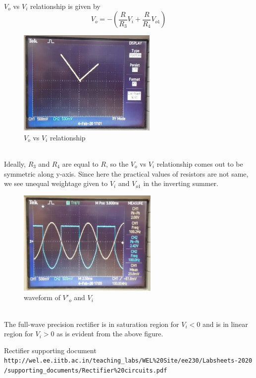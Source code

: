\documentclass[12pt]{article}
\begin{document}
        \\
        $V_o$ vs $V_i$ relationship is given by
        \begin{equation}
            V_o = -(\frac{R}{R_3}V_i + \frac{R}{R_4}V_{o1})
        \end{equation}
        \begin{figure}[H]
            \centering
            \includegraphics[width = 0.5\linewidth, height = 2in]{reports/lab3/full_wave-xy.jpeg}
            \caption{$V_o$ vs $V_i$ relationship}
        \end{figure}
        \\
        Ideally, $R_3$ and $R_4$ are equal to $R$, so the $V_o$ vs $V_i$ relationship comes out to be symmetric along y-axis. Since here the practical values of resistors are not same, we see unequal weightage given to $V_i$ and $V_{o1}$ in the inverting summer.
        \begin{figure}[H]
            \centering
            \includegraphics[width = 0.5\linewidth, height = 2in]{reports/lab3/Vo_full.jpeg}
            \caption{waveform of $V'_o$ and $V_i$}
        \end{figure}
        \\
        The full-wave precision rectifier is in saturation region for
        $V_i < 0$ and is in linear region for $V_i > 0$ as is evident from the above figure.
        
\vspace{4cm}

    \begin{thebibliography}{9}

        Rectifier supporting document 
        \\\texttt{http://wel.ee.iitb.ac.in/teaching\_labs/WEL\%20Site/ee230/Labsheets-2020\\/supporting\_documents/Rectifier\%20circuits.pdf}
        
    \end{thebibliography}
\end{document}
